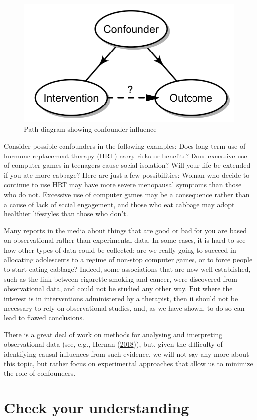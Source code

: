 \documentclass{krantz}
\begin{document}
\begin{figure}
\includegraphics[width=0.5\linewidth]{images_bw/confounder} \caption{Path diagram showing confounder influence}\label{fig:confoundfig}
\end{figure}

Consider possible confounders in the following examples: Does long-term use of hormone replacement therapy (HRT) carry risks or benefits? Does excessive use of computer games in teenagers cause social isolation? Will your life be extended if you ate more cabbage? Here are just a few possibilities: Woman who decide to continue to use HRT may have more severe menopausal symptoms than those who do not. Excessive use of computer games may be a consequence rather than a cause of lack of social engagement, and those who eat cabbage may adopt healthier lifestyles than those who don't.

Many reports in the media about things that are good or bad for you are based on observational rather than experimental data. In some cases, it is hard to see how other types of data could be collected: are we really going to succeed in allocating adolescents to a regime of non-stop computer games, or to force people to start eating cabbage? Indeed, some associations that are now well-established, such as the link between cigarette smoking and cancer, were discovered from observational data, and could not be studied any other way. But where the interest is in interventions administered by a therapist, then it should not be necessary to rely on observational studies, and, as we have shown, to do so can lead to flawed conclusions.

There is a great deal of work on methods for analysing and interpreting observational data (see, e.g., Hernan (\protect\hyperlink{ref-hernan2018}{2018})), but, given the difficulty of identifying causal influences from such evidence, we will not say any more about this topic, but rather focus on experimental approaches that allow us to minimize the role of confounders.

\hypertarget{check-your-understanding-1}{%
\section{Check your understanding}\label{check-your-understanding-1}}
\end{document}
